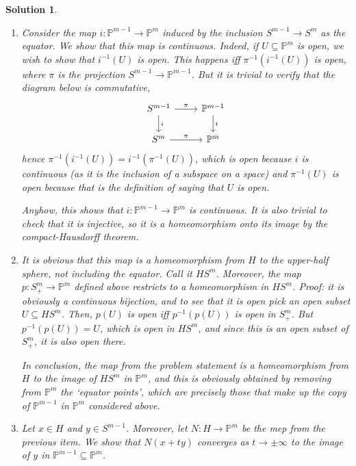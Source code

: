 \documentclass{article}
\theoremstyle{plain}
\theoremstyle{nonumberplain}
\newtheorem{sol}{Solution}
\newcommand{\PP}{\mathbb{P}}
\begin{document}
\begin{sol}
\begin{enumerate}
\item Consider the map $i \colon \PP^{m-1} \to \PP^m$ induced by the inclusion $S^{m-1} \to S^m$ as the equator. We show that this map is continuous. Indeed, if $U \subseteq \PP^m$ is open, we wish to show that $i^{-1}(U)$ is open. This happens iff $\pi^{-1}(i^{-1}(U))$ is open, where $\pi$ is the projection $S^{m-1} \to \PP^{m-1}$. But it is trivial to verify that the diagram below is commutative,
\begin{equation}
\begin{tikzcd}
S^{m-1} \arrow[r, "\pi"] \arrow[d, "i"] & \PP^{m-1} \arrow[d, "i"] \\
S^m \arrow[r, "\pi"]                    & \PP^m                   
\end{tikzcd}
\end{equation}
hence $\pi^{-1}(i^{-1}(U)) = i^{-1}(\pi^{-1}(U))$, which is open because $i$ is continuous (as it is the inclusion of a subspace on a space) and $\pi^{-1}(U)$ is open because that is the definition of saying that $U$ is open.

Anyhow, this shows that $i \colon \PP^{m-1} \to \PP^m$ is continuous. It is also trivial to check that it is injective, so it is a homeomorphism onto its image by the compact-Hausdorff theorem.

\item It is obvious that this map is a homeomorphism from $H$ to the upper-half sphere, not including the equator. Call it $HS^m$. Moreover, the map $p \colon S^m_+ \to \PP^m$ defined above restricts to a homeomorphism in $HS^m$. Proof: it is obviously a continuous bijection, and to see that it is open pick an open subset $U \subseteq HS^m$. Then, $p(U)$ is open iff $p^{-1}(p(U))$ is open in $S^m_+$. But $p^{-1}(p(U)) = U$, which is open in $HS^m$, and since this is an open subset of $S^m_+$, it is also open there.

In conclusion, the map from the problem statement is a homeomorphism from $H$ to the image of $HS^m$ in $\PP^m$, and this is obviously obtained by removing from $\PP^m$ the `equator points', which are precisely those that make up the copy of $\PP^{m-1}$ in $\PP^m$ considered above.

\item Let $x \in H$ and $y \in S^{m-1}$. Moreover, let $N \colon H \to \PP^m$ be the mep from the previous item. We show that $N(x + t y)$ converges as $t \to \pm \infty$ to the image of $y$ in $\PP^{m-1} \subseteq \PP^m$.


\end{enumerate}
\end{sol}
\end{document}
